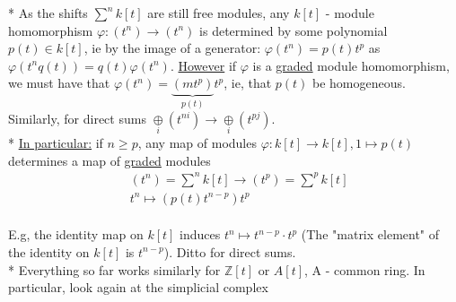 \documentclass[11pt,a4paper]{report}
\begin{document}
              * As the shifts $\sum^nk[t]$ are still free modules, any $k[t]$ - module homomorphism $\varphi: (t^n) \rightarrow (t^n)$ is determined by some polynomial $p(t) \in k[t]$, ie by the image of a generator: $\varphi(t^n) = p(t)t^p$ as $\varphi(t^nq(t)) = q(t)\varphi(t^n)$. \underline{However} if $\varphi$ is a \underline{graded} module homomorphism, we must have that $\varphi(t^n) = \underbrace{(mt^p)}_{p(t)}t^p$, ie, that $p(t)$ be homogeneous. Similarly, for direct sums $\underset{i}{\oplus}(t^{ni}) \rightarrow \underset{i}{\oplus}(t^{pj})$.\\
              * \underline{In particular:} if $n \ge p$, any map of modules $\varphi: k[t] \rightarrow k[t], 1 \mapsto p(t)$ determines a map of \underline{graded} modules
              \begin{align*}
                &(t^n) = \sum^nk[t] \rightarrow (t^p) = \sum^pk[t]\\
                &t^n \mapsto (p(t)t^{n-p})t^p
              \end{align*}
              \\
              E.g, the identity map on $k[t]$ induces $t^n \mapsto t^{n-p} \cdot t^p$ (The "matrix element" of the identity on $k[t]$ is $t^{n-p}$). Ditto for direct sums.\\
              * Everything so far works similarly for $\mathbb{Z}[t]$ or $A[t]$, A - common ring. In particular, look again at the simplicial complex
\end{document}
